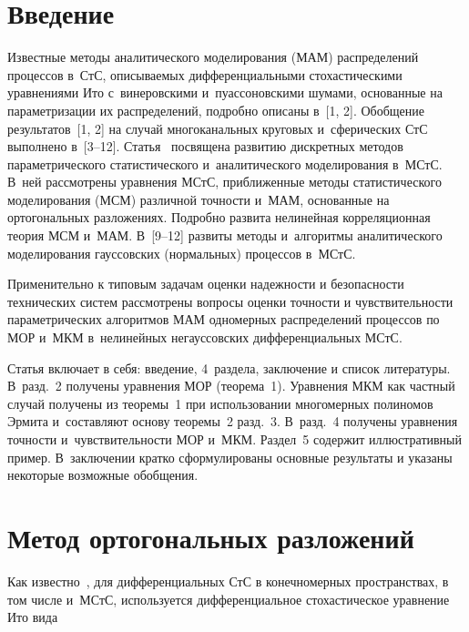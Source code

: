 
\thispagestyle{headings}

\begin{multicols}{2}

\label{st\stat}



\section{Введение}


Известные методы аналитического моделирования (МАМ) распределений процессов
в~СтС, описываемых дифференциальными стохастическими
уравнениями Ито с~винеровскими и~пуассоновскими шумами, основанные на
параметризации их распределений, подробно описаны в~[1, 2].
Обобщение результатов~[1, 2] на случай многоканальных круговых
и~сферических СтС выполнено в~[3--12].\linebreak
Статья~\cite{8-sin} посвящена развитию дискретных методов параметрического
статистического и~анали\-тического моделирования в~МСтС.
В~ней рассмот\-рены уравнения МСтС, приближенные методы\linebreak
 статистического моделирования
 (МСМ) различной точности и~МАМ,
 основанные на ортогональных разложениях. Подробно развита нелинейная
 корреляционная теория МСМ и~МАМ.
В~[9--12] развиты методы и~алгоритмы аналитического моделирования гауссовских
(нормальных) процессов в~МСтС.

Применительно к типовым задачам оценки надежности и безопасности технических
систем рассмотрены вопросы оценки точности и чувствительности параметрических
алгоритмов МАМ одномерных распределений процессов по 
МОР и~МКМ в~нелинейных негауссовских дифференциальных МСтС.

Статья включает в себя: введение, 4~раздела, заключение и список литературы.
В~разд.~2 получены уравнения МОР (теорема~1). Уравнения МКМ как частный случай
получены из теоремы~1 при использовании многомерных полиномов Эрмита
и~со\-став\-ля\-ют основу теоремы~2 разд.~3. В~разд.~4 получены уравнения точности
и~чувствительности МОР и~МКМ. Раздел~5 содержит иллюстративный пример.
В~заключении кратко сформулированы основные результаты и указаны некоторые
возможные обобщения.

\section{Метод ортогональных разложений}

Как известно~\cite{1-sin, 8-sin}, для
дифференциальных  СтС в
конечномерных пространствах, в том числе и~МСтС, используется
дифференциальное стохастическое уравнение Ито вида


\end{multicols}
